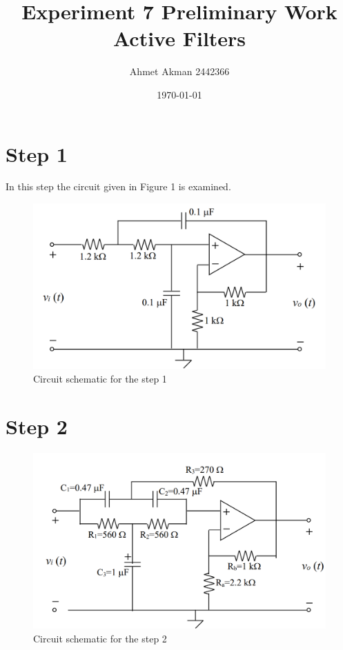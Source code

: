 \documentclass[letterpaper,12pt]{article}
\begin{document}
\title{Experiment 7 Preliminary Work \protect\\ Active Filters}
\author{Ahmet Akman 2442366 \protect\\}
\date{\today}
\maketitle
\tableofcontents

\section{Step 1}
In this step the circuit given in Figure 1 is examined.
\begin{figure}[H]
    \centering
    \includegraphics[width=1\textwidth]{fig1.png}
    \caption{Circuit schematic for the step 1}
\end{figure} 
\section{Step 2}
\begin{figure}[H]
\centering
\includegraphics[width=1\textwidth]{fig2.png}
\caption{Circuit schematic for the step 2}
\end{figure} 
\end{document}
